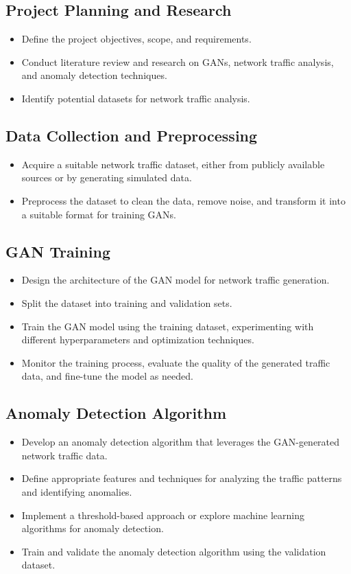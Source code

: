 \documentclass[12pt]{article}
\begin{document}
\subsection{ Project Planning and Research}
\begin{itemize}
  \item Define the project objectives, scope, and requirements.
  \item Conduct literature review and research on GANs, network traffic analysis, and anomaly detection techniques.
  \item Identify potential datasets for network traffic analysis.
\end{itemize}

\subsection{ Data Collection and Preprocessing}
\begin{itemize}
  \item Acquire a suitable network traffic dataset, either from publicly available sources or by generating simulated data.
  \item Preprocess the dataset to clean the data, remove noise, and transform it into a suitable format for training GANs.
\end{itemize}

\subsection{ GAN Training}
\begin{itemize}
  \item Design the architecture of the GAN model for network traffic generation.
  \item Split the dataset into training and validation sets.
  \item Train the GAN model using the training dataset, experimenting with different hyperparameters and optimization techniques.
  \item Monitor the training process, evaluate the quality of the generated traffic data, and fine-tune the model as needed.
\end{itemize}

\subsection{ Anomaly Detection Algorithm}
\begin{itemize}
  \item Develop an anomaly detection algorithm that leverages the GAN-generated network traffic data.
  \item Define appropriate features and techniques for analyzing the traffic patterns and identifying anomalies.
  \item Implement a threshold-based approach or explore machine learning algorithms for anomaly detection.
  \item Train and validate the anomaly detection algorithm using the validation dataset.
\end{itemize}
\end{document}

